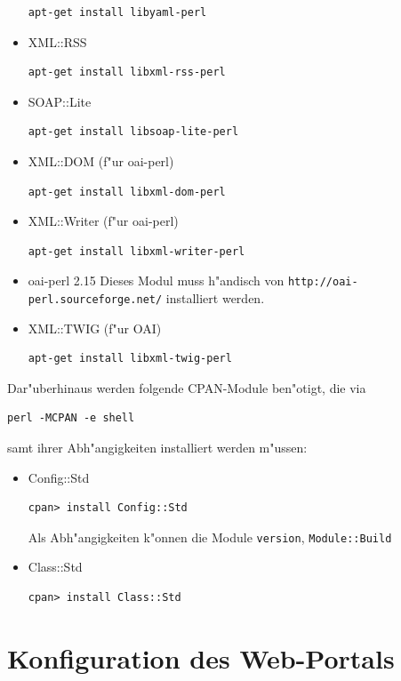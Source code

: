 \documentclass[11pt, twoside, a4paper, BCOR8mm, DIV12, bibtotoc,idxtotoc]{scrbook}
\begin{document}
\begin{itemize}
\begin{verbatim}
apt-get install libyaml-perl
\end{verbatim}
\item XML::RSS
\begin{verbatim}
apt-get install libxml-rss-perl
\end{verbatim}
\item SOAP::Lite
\begin{verbatim}
apt-get install libsoap-lite-perl
\end{verbatim}
\item XML::DOM (f"ur oai-perl)
\begin{verbatim}
apt-get install libxml-dom-perl
\end{verbatim}
\item XML::Writer (f"ur oai-perl)
\begin{verbatim}
apt-get install libxml-writer-perl
\end{verbatim}
\item oai-perl 2.15
Dieses Modul muss h"andisch von
\texttt{http://oai-perl.sourceforge.net/} installiert werden.
\item XML::TWIG (f"ur OAI)
\begin{verbatim}
apt-get install libxml-twig-perl
\end{verbatim}
\end{itemize}

Dar"uberhinaus werden folgende CPAN-Module ben"otigt, die via

\begin{verbatim}
perl -MCPAN -e shell
\end{verbatim}

samt ihrer Abh"angigkeiten installiert werden m"ussen:

\begin{itemize}
\item Config::Std
\begin{verbatim}
cpan> install Config::Std
\end{verbatim}
Als Abh"angigkeiten k"onnen die Module \texttt{version}, \texttt{Module::Build}
\item Class::Std
\begin{verbatim}
cpan> install Class::Std
\end{verbatim}
\end{itemize}
\section{Konfiguration des Web-Portals}
\label{sec:confportal}
\end{document}
